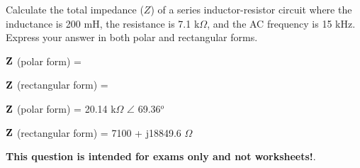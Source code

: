 

Calculate the total impedance ($Z$) of a series inductor-resistor circuit where the inductance is 200 mH, the resistance is 7.1 k$\Omega$, and the AC frequency is 15 kHz.  Express your answer in both polar and rectangular forms.

\vskip 10pt

${\bf Z}$ (polar form) = 

\vskip 10pt

${\bf Z}$ (rectangular form) = 







${\bf Z}$ (polar form) = 20.14 k$\Omega$ $\angle$ 69.36$^{o}$

\vskip 10pt

${\bf Z}$ (rectangular form) = 7100 + j18849.6 $\Omega$







{\bf This question is intended for exams only and not worksheets!}.



